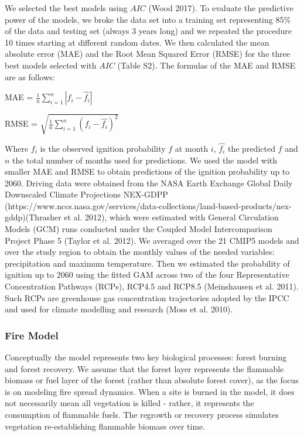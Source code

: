 \documentclass[
]{article}
\begin{document}
We selected the best models using \(AIC\) (Wood 2017). To evaluate the
predictive power of the models, we broke the data set into a training
set representing 85\% of the data and testing set (always 3 years long)
and we repeated the procedure 10 times starting at different random
dates. We then calculated the mean absolute error (MAE) and the Root
Mean Squared Error (RMSE) for the three best models selected with
\(AIC\) (Table S2). The formulas of the MAE and RMSE are as follows:

MAE = \(\frac{1}{n} \sum_{i=1}^n |f_i - \hat{f_i}|\)

RMSE = \(\sqrt{\frac{1}{n} \sum_{i=1}^n (f_i - \hat{f_i})^2}\)

Where \(f_i\) is the observed ignition probability \(f\) at month \(i\),
\(\hat{f_i}\) the predicted \(f\) and \(n\) the total number of months
used for predictions. We used the model with smaller MAE and RMSE to
obtain predictions of the ignition probability up to 2060. Driving data
were obtained from the NASA Earth Exchange Global Daily Downscaled
Climate Projections NEX-GDPP
(https://www.nccs.nasa.gov/services/data-collections/land-based-products/nex-gddp)(Thrasher
et al. 2012), which were estimated with General Circulation Models (GCM)
runs conducted under the Coupled Model Intercomparison Project Phase 5
(Taylor et al. 2012). We averaged over the 21 CMIP5 models and over the
study region to obtain the monthly values of the needed variables:
precipitation and maximum temperature. Then we estimated the probability
of ignition up to 2060 using the fitted GAM across two of the four
Representative Concentration Pathways (RCPs), RCP4.5 and RCP8.5
(Meinshausen et al. 2011). Such RCPs are greenhouse gas concentration
trajectories adopted by the IPCC and used for climate modelling and
research (Moss et al. 2010).

\subsubsection{Fire Model}\label{fire-model}

Conceptually the model represents two key biological processes: forest
burning and forest recovery. We assume that the forest layer represents
the flammable biomass or fuel layer of the forest (rather than absolute
forest cover), as the focus is on modeling fire spread dynamics. When a
site is burned in the model, it does not necessarily mean all vegetation
is killed - rather, it represents the consumption of flammable fuels.
The regrowth or recovery process simulates vegetation re-establishing
flammable biomass over time.
\end{document}
